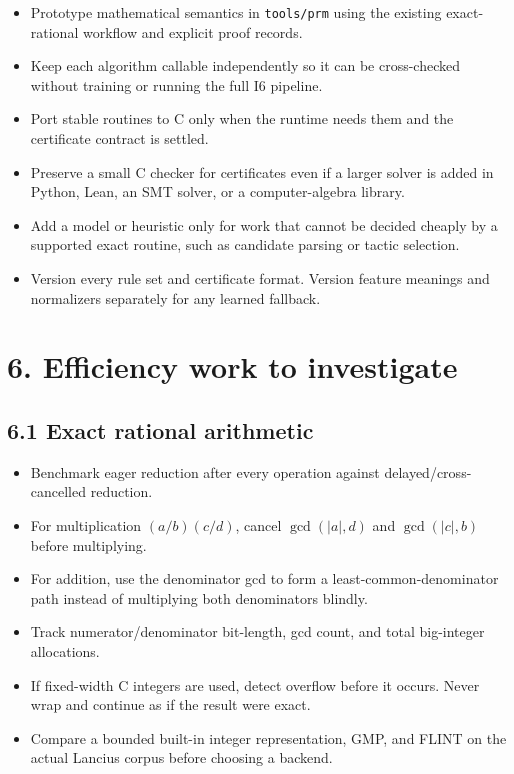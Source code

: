 \documentclass[
  10pt,
]{article}
\providecommand{\tightlist}{%
  \setlength{\itemsep}{0pt}\setlength{\parskip}{0pt}}
\begin{document}
\begin{itemize}
\tightlist
\item
  Prototype mathematical semantics in \texttt{tools/prm} using the
  existing exact-rational workflow and explicit proof records.
\item
  Keep each algorithm callable independently so it can be cross-checked
  without training or running the full I6 pipeline.
\item
  Port stable routines to C only when the runtime needs them and the
  certificate contract is settled.
\item
  Preserve a small C checker for certificates even if a larger solver is
  added in Python, Lean, an SMT solver, or a computer-algebra library.
\item
  Add a model or heuristic only for work that cannot be decided cheaply
  by a supported exact routine, such as candidate parsing or tactic
  selection.
\item
  Version every rule set and certificate format. Version feature
  meanings and normalizers separately for any learned fallback.
\end{itemize}

\section{6. Efficiency work to
investigate}\label{efficiency-work-to-investigate}

\subsection{6.1 Exact rational
arithmetic}\label{exact-rational-arithmetic}

\begin{itemize}
\tightlist
\item
  Benchmark eager reduction after every operation against
  delayed/cross-cancelled reduction.
\item
  For multiplication \((a/b)(c/d)\), cancel \(\gcd(|a|,d)\) and
  \(\gcd(|c|,b)\) before multiplying.
\item
  For addition, use the denominator gcd to form a
  least-common-denominator path instead of multiplying both denominators
  blindly.
\item
  Track numerator/denominator bit-length, gcd count, and total
  big-integer allocations.
\item
  If fixed-width C integers are used, detect overflow before it occurs.
  Never wrap and continue as if the result were exact.
\item
  Compare a bounded built-in integer representation, GMP, and FLINT on
  the actual Lancius corpus before choosing a backend.
\end{itemize}
\end{document}
